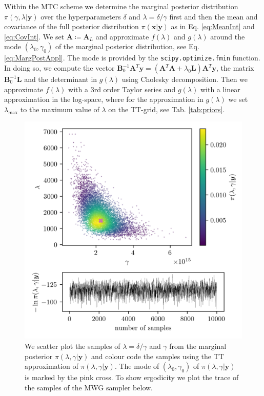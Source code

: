 Within the MTC scheme we determine the marginal posterior distribution $\pi(\gamma, \lambda| \bm{y})$ over the hyperparameters $\delta$  and $\lambda = \delta / \gamma$ first and then the mean and covariance of the full posterior distribution $\pi(\bm{x}|\bm{y})$ as in Eq. \ref{eq:MeanInt} and \ref{eq:CovInt}.
We set $\bm{A} \coloneqq  \bm{A}_L$ and approximate $f(\lambda)$  and $g(\lambda)$ around the mode $( \lambda_{0}, \gamma_0 )$ of the marginal posterior distribution, see Eq. \ref{eq:MargPostAppl}.
The mode is provided by the \texttt{scipy.optimize.fmin} function.
In doing so, we compute the vector $\bm{B}_0^{-1}\bm{A}^T\bm{y} = (\bm{A}^T\bm{A} + \lambda_0 \bm{L})\bm{A}^T\bm{y} $, the matrix $\bm{B}_0^{-1}\bm{L}$ and the determinant in $g(\lambda)$ using Cholesky decomposition.
Then we approximate $f(\lambda)$ with a 3rd order Taylor series and $g(\lambda)$ with a linear approximation in the log-space, where for the approximation in $g(\lambda)$ we set $\lambda_{\text{max}}$ to the maximum value of $\lambda$ on the TT-grid, see Tab. \ref{tab:priors}.
\begin{figure}[ht!]
	\centering
	\includegraphics{ScatterplusHistoPlusTT.png}
	\caption[Scatter plot of samples from marginal posterior, including weighting from TT approximation; trace plot of the marginal posterior samples.]{We scatter plot the samples of $\lambda = \delta / \gamma $ and $\gamma$ from the marginal posterior $\pi(\lambda , \gamma  | \bm{y})$ and colour code the samples using the TT approximation of $\pi(\lambda , \gamma  | \bm{y})$. The mode of $(\lambda_0 , \gamma_0)$ of $\pi(\lambda , \gamma  | \bm{y})$ is marked by the pink cross. To show ergodicity we plot the trace of the samples of the MWG sampler below.}
	\label{fig:ScatterPlotTT}
\end{figure}


